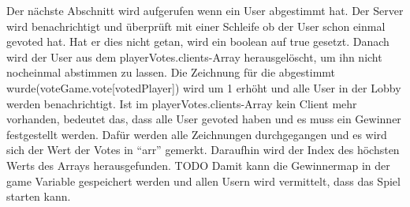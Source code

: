 Der nächste Abschnitt wird aufgerufen wenn ein User abgestimmt hat. Der Server wird benachrichtigt und überprüft mit einer Schleife ob der User
schon einmal gevoted hat. Hat er dies nicht getan, wird ein boolean auf true gesetzt.
Danach wird der User aus dem playerVotes.clients-Array herausgelöscht, um ihn nicht nocheinmal abstimmen zu lassen. Die Zeichnung für die abgestimmt wurde(voteGame.vote[votedPlayer]) wird um 1 erhöht und alle User in der Lobby werden benachrichtigt.
Ist im playerVotes.clients-Array kein Client mehr vorhanden, bedeutet das, dass alle User gevoted haben und es muss ein Gewinner festgestellt werden.
Dafür werden alle Zeichnungen durchgegangen und es wird sich der Wert der Votes in ``arr'' gemerkt. Daraufhin wird der Index des höchsten Werts des Arrays herausgefunden. TODO
Damit kann die Gewinnermap in der game Variable gespeichert werden und allen Usern wird vermittelt, dass das Spiel starten kann.
